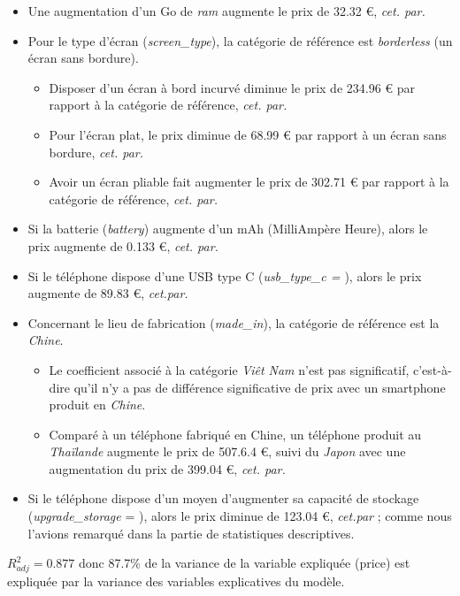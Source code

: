 \documentclass[
  12pt,
]{report}
\providecommand{\tightlist}{%
  \setlength{\itemsep}{0pt}\setlength{\parskip}{0pt}}\usepackage{longtable,booktabs,array}
\renewcommand{\texttt}[1]{\colorbox{light}{\color{highlight}{\ttfamily{#1}}}}
\begin{document}
\begin{itemize}
\item
  Une augmentation d'un Go de \emph{ram} augmente le prix de 32.32 €,
  \emph{cet. par.}
\item
  Pour le type d'écran (\emph{screen\_type}), la catégorie de référence
  est \emph{borderless} (un écran sans bordure).

  \begin{itemize}
  \tightlist
  \item
    Disposer d'un écran à bord incurvé diminue le prix de 234.96 € par
    rapport à la catégorie de référence, \emph{cet. par.}
  \item
    Pour l'écran plat, le prix diminue de 68.99 € par rapport à un écran
    sans bordure, \emph{cet. par.}
  \item
    Avoir un écran pliable fait augmenter le prix de 302.71 € par
    rapport à la catégorie de référence, \emph{cet. par.}
  \end{itemize}
\item
  Si la batterie (\emph{battery}) augmente d'un mAh (MilliAmpère Heure),
  alors le prix augmente de 0.133 €, \emph{cet. par.}
\item
  Si le téléphone dispose d'une USB type C (\emph{usb\_type\_c =
  \texttt{TRUE}}), alors le prix augmente de 89.83 €, \emph{cet.par.}
\item
  Concernant le lieu de fabrication (\emph{made\_in}), la catégorie de
  référence est la \emph{Chine}.

  \begin{itemize}
  \tightlist
  \item
    Le coefficient associé à la catégorie \emph{Viêt Nam} n'est pas
    significatif, c'est-à-dire qu'il n'y a pas de différence
    significative de prix avec un smartphone produit en \emph{Chine}.
  \item
    Comparé à un téléphone fabriqué en Chine, un téléphone produit au
    \emph{Thaïlande} augmente le prix de 507.6.4 €, suivi du
    \emph{Japon} avec une augmentation du prix de 399.04 €, \emph{cet.
    par.}
  \end{itemize}
\item
  Si le téléphone dispose d'un moyen d'augmenter sa capacité de stockage
  (\emph{upgrade\_storage} = \texttt{TRUE}), alors le prix diminue de
  123.04 €, \emph{cet.par} ; comme nous l'avions remarqué dans la partie
  de statistiques descriptives.
\end{itemize}

\(R^2_{adj} = 0.877\) donc 87.7\% de la variance de la variable
expliquée (price) est expliquée par la variance des variables
explicatives du modèle.
\end{document}
